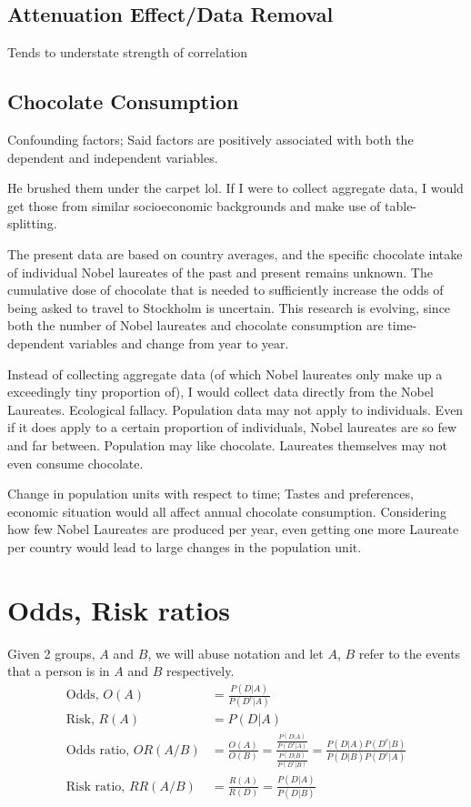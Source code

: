 \documentclass{article}
\begin{document}
\subsection{Attenuation Effect/Data Removal}
Tends to understate strength of correlation

\subsection{Chocolate Consumption}
Confounding factors; Said factors are positively associated with both the dependent and independent variables.

He brushed them under the carpet lol.
If I were to collect aggregate data, I would get those from similar socioeconomic backgrounds and make use of table-splitting.

The present data are based on country averages,
and the specific chocolate intake of individual
Nobel laureates of the past and present remains
unknown. The cumulative dose of chocolate that
is needed to sufficiently increase the odds of being asked to travel to Stockholm is uncertain.
This research is evolving, since both the number
of Nobel laureates and chocolate consumption
are time-dependent variables and change from
year to year.

Instead of collecting aggregate data (of which Nobel laureates only make up a exceedingly tiny proportion of), I would collect data directly from the Nobel Laureates. Ecological fallacy. Population data may not apply to individuals. Even if it does apply to a certain proportion of individuals, Nobel laureates are so few and far between.
Population may like chocolate. Laureates themselves may not even consume chocolate.

Change in population units with respect to time; Tastes and preferences, economic situation would all affect annual chocolate consumption. Considering how few Nobel Laureates are produced per year, even getting one more Laureate per country would lead to large changes in the population unit. 



\section{Odds, Risk ratios}
Given 2 groups, $A$ and $B$, we will abuse notation and let $A$, $B$ refer to the events that a person is in $A$ and $B$ respectively.
\begin{align*}
	\text{Odds, } O(A)&=\frac{P(D|A)}{P(D^c|A)}\\
	\text{Risk, } R(A)&=P(D|A)\\
	\text{Odds ratio, }OR(A/B)&=\frac{O(A)}{O(B)}=\frac{\frac{P(D|A)}{P(D^c|A)}}{\frac{P(D|B)}{P(D^c|B)}}=\frac{P(D|A)P(D^c|B)}{P(D|B)P(D^c|A)}\\
	\text{Risk ratio, }RR(A/B)&=\frac{R(A)}{R(D)}=\frac{P(D|A)}{P(D|B)}
\end{align*}
\end{document}
